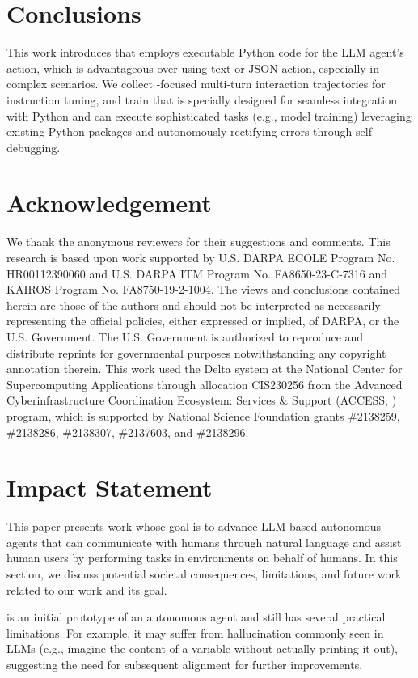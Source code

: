 \section{Conclusions}
This work introduces \approach that employs executable Python code for the LLM agent's action, which is advantageous over using text or JSON action, especially in complex scenarios.
% 
We collect \approach-focused multi-turn interaction trajectories \dataname for instruction tuning, and train \modelname that is specially designed for seamless integration with Python and can execute sophisticated tasks (e.g., model training) leveraging existing Python packages and autonomously rectifying errors through self-debugging. 


\section*{Acknowledgement}
We thank the anonymous reviewers for their suggestions and comments.
% 
This research is based upon work supported by U.S. DARPA ECOLE Program No. HR00112390060 and U.S. DARPA ITM Program No. FA8650-23-C-7316 and KAIROS Program No. FA8750-19-2-1004. The views and conclusions contained herein are those of the authors and should not be interpreted as necessarily representing the official policies, either expressed or implied, of DARPA, or the U.S. Government. The U.S. Government is authorized to reproduce and distribute reprints for governmental purposes notwithstanding any copyright annotation therein.
% 
This work used the Delta system at the National Center for Supercomputing Applications through allocation CIS230256 from the Advanced Cyberinfrastructure Coordination Ecosystem: Services \& Support (ACCESS, \citealt{boerner2023access}) program, which is supported by National Science Foundation grants \#2138259, \#2138286, \#2138307, \#2137603, and \#2138296.


\section*{Impact Statement}
This paper presents work whose goal is to advance LLM-based autonomous agents that can communicate with humans through natural language and assist human users by performing tasks in environments on behalf of humans.
% 
In this section, we discuss potential societal consequences, limitations, and future work related to our work and its goal.

\modelname is an initial prototype of an autonomous agent and still has several practical limitations. For example, it may suffer from hallucination commonly seen in LLMs (e.g., imagine the content of a variable without actually printing it out), suggesting the need for subsequent alignment \citep{ouyang2022training} for further improvements.

